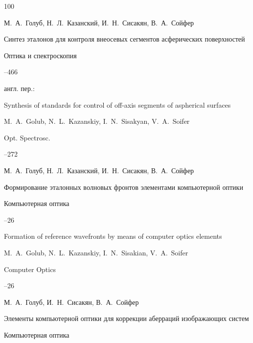 \begin{thebibliography}{100}

\by М.~А.~Голуб, Н.~Л.~Казанский, И.~Н.~Сисакян, В.~А.~Сойфер

\paper Синтез эталонов для контроля внеосевых сегментов асферических поверхностей

\jour Оптика и спектроскопия




--466

\transl англ. пер.:~

\paper Synthesis of standards for control of off-axis segments of aspherical surfaces

\by M.~A.~Golub, N.~L.~Kazanskiy, I.~N.~Sisakyan, V.~A.~Soifer

\jour Opt. Spectrosc.




--272




\by  М.~А.~Голуб, Н.~Л.~Казанский, И.~Н.~Сисакян, В.~А.~Сойфер

\paper Формирование эталонных волновых фронтов элементами компьютерной оптики

\jour Компьютерная оптика



--26

\misctransl

\paper Formation of reference wavefronts by means of computer optics elements 

\by M.~A.~Golub, N.~L.~Kazanskiy, I.~N.~Sisakian, V.~A.~Soifer 

\jour Computer Optics



--26






\by М.~А.~Голуб, И.~Н.~Сисакян, В.~А.~Сойфер

\paper Элементы компьютерной оптики для коррекции аберраций изображающих систем 

\jour Компьютерная оптика



\end{thebibliography}
